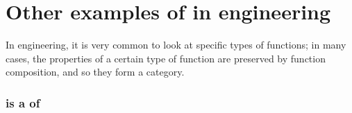 
\section[Other examples]{Other examples of  in engineering}

In engineering, it is very common to look at specific types of functions; in many cases, the properties of a certain type of function are preserved by function composition, and so they form a category.

\subsubsection{\Injset is a  of \Set}

